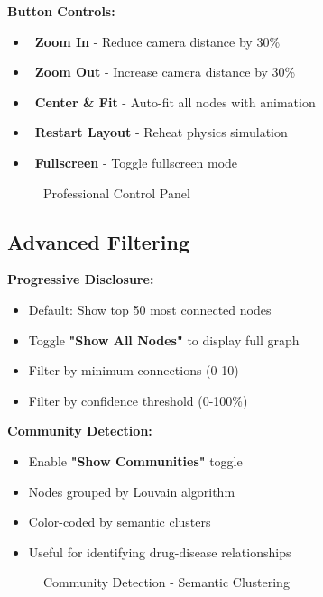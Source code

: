 \textbf{Button Controls:}
\begin{itemize}
    \item \faSearchPlus\ \textbf{Zoom In} - Reduce camera distance by 30\%
    \item \faSearchMinus\ \textbf{Zoom Out} - Increase camera distance by 30\%
    \item \faBullseye\ \textbf{Center \& Fit} - Auto-fit all nodes with animation
    \item \faRedo\ \textbf{Restart Layout} - Reheat physics simulation
    \item \faExpand\ \textbf{Fullscreen} - Toggle fullscreen mode
\end{itemize}

\begin{figure}[h]
\centering
{}
\caption{Professional Control Panel}
\label{fig:graph-controls}
\end{figure}

\subsection{Advanced Filtering}

\textbf{Progressive Disclosure:}
\begin{itemize}
    \item Default: Show top 50 most connected nodes
    \item Toggle \textbf{"Show All Nodes"} to display full graph
    \item Filter by minimum connections (0-10)
    \item Filter by confidence threshold (0-100\%)
\end{itemize}

\textbf{Community Detection:}
\begin{itemize}
    \item Enable \textbf{"Show Communities"} toggle
    \item Nodes grouped by Louvain algorithm
    \item Color-coded by semantic clusters
    \item Useful for identifying drug-disease relationships
\end{itemize}

\begin{figure}[h]
\centering
{}
\caption{Community Detection - Semantic Clustering}
\label{fig:communities}
\end{figure}

